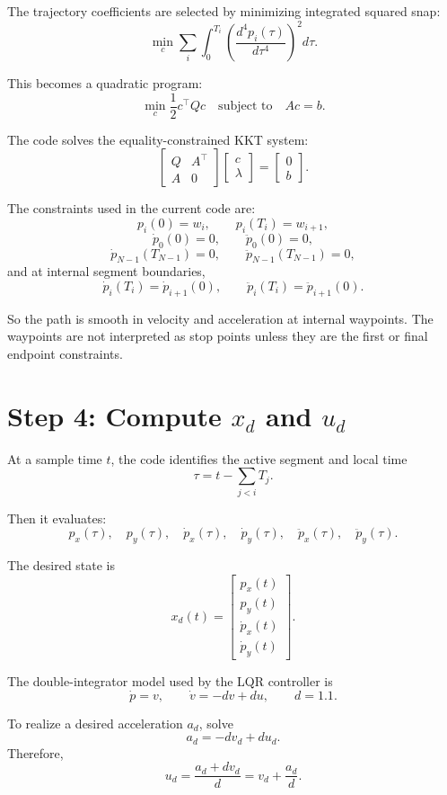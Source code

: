 \documentclass[11pt]{article}
\begin{document}
The trajectory coefficients are selected by minimizing integrated squared snap:
\[
\min_c
\sum_i \int_0^{T_i}
\left(\frac{d^4 p_i(\tau)}{d\tau^4}\right)^2
d\tau.
\]

This becomes a quadratic program:
\[
\min_c \frac{1}{2}c^\top Qc
\quad \text{subject to} \quad Ac=b.
\]

The code solves the equality-constrained KKT system:
\[
\begin{bmatrix}
Q & A^\top\\
A & 0
\end{bmatrix}
\begin{bmatrix}
c\\
\lambda
\end{bmatrix}
=
\begin{bmatrix}
0\\
b
\end{bmatrix}.
\]

The constraints used in the current code are:
\[
p_i(0)=w_i,\qquad p_i(T_i)=w_{i+1},
\]
\[
\dot p_0(0)=0,\qquad \ddot p_0(0)=0,
\]
\[
\dot p_{N-1}(T_{N-1})=0,\qquad
\ddot p_{N-1}(T_{N-1})=0,
\]
and at internal segment boundaries,
\[
\dot p_i(T_i)=\dot p_{i+1}(0),
\qquad
\ddot p_i(T_i)=\ddot p_{i+1}(0).
\]

So the path is smooth in velocity and acceleration at internal waypoints.  The
waypoints are not interpreted as stop points unless they are the first or final
endpoint constraints.

\section*{Step 4: Compute $x_d$ and $u_d$}

At a sample time $t$, the code identifies the active segment and local time
\[
\tau = t - \sum_{j<i} T_j.
\]

Then it evaluates:
\[
p_x(\tau),\quad p_y(\tau),\quad
\dot p_x(\tau),\quad \dot p_y(\tau),\quad
\ddot p_x(\tau),\quad \ddot p_y(\tau).
\]

The desired state is
\[
x_d(t)
=
\begin{bmatrix}
p_x(t)\\
p_y(t)\\
\dot p_x(t)\\
\dot p_y(t)
\end{bmatrix}.
\]

The double-integrator model used by the LQR controller is
\[
\dot p = v,\qquad
\dot v = -d v + d u,
\qquad d=1.1.
\]

To realize a desired acceleration $a_d$, solve
\[
a_d = -d v_d + d u_d.
\]
Therefore,
\[
u_d
=
\frac{a_d+d v_d}{d}
=
v_d + \frac{a_d}{d}.
\]
\end{document}
